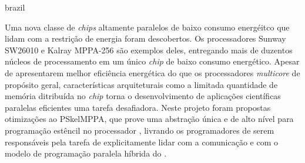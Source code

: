 \swapcontents



{
    \begin{otherlanguage*}{brazil}
    \begin{resumo}[Resumo]

        Uma nova classe de \textit{chips} altamente paralelos de baixo consumo energéitco que lidam com a restrição de energia foram descobertos. Os processadores Sunway SW26010 e Kalray MPPA-256 são exemplos deles, entregando mais de duzentos núcleos de processamento em um único \textit{chip} de baixo consumo energético. Apesar de apresentarem melhor eficiência energética do que os processadores \textit{multicore} de propósito geral, características arquiteturais como a limitada quantidade de memória ditribuída no \textit{chip} torna o desenvolvimento de aplicações científicas paralelas eficientes uma tarefa desafiadora. Neste projeto foram propostas otimizações ao \fw PSkelMPPA, que prove uma abstração única e de alto nível para programação estêncil no processador \mppa, livrando os programadores de serem responsáveis pela tarefa de explicitamente lidar com a comunicação e com o modelo de programação paralela híbrida do \mppa.


    \end{resumo}
    \end{otherlanguage*}
}



